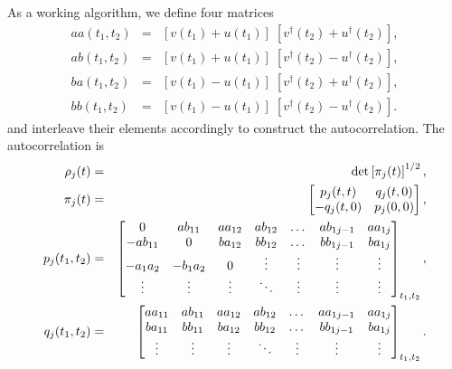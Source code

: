 \documentclass[a4paper,10pt]{article}
\begin{document}
As a working algorithm, we define four matrices
\begin{eqnarray}
  a a  (t_1,t_2) & = & \left[v(t_1)+u(t_1)\right]\;\left[v^\dagger(t_2)+u^\dagger(t_2)\right] ,\nonumber \\
  a b  (t_1,t_2) & = & \left[v(t_1)+u(t_1)\right]\;\left[v^\dagger(t_2)-u^\dagger(t_2)\right] ,\nonumber \\
  b a  (t_1,t_2) & = & \left[v(t_1)-u(t_1)\right]\;\left[v^\dagger(t_2)+u^\dagger(t_2)\right] ,\nonumber \\
  b b  (t_1,t_2) & = & \left[v(t_1)-u(t_1)\right]\;\left[v^\dagger(t_2)-u^\dagger(t_2)\right] .
\end{eqnarray}
and interleave their elements accordingly to construct the autocorrelation. The autocorrelation is
\begin{eqnarray}
\label{eq:aotocorr:formula}
\rho_j(t) &=& {\rm det}\left[\pi_j(t)\right]^{1/2},\nonumber \\
\pi_j(t)  &=& \begin{bmatrix}
            p_j(t,t) & q_j(t,0) \\
            -q_j(t,0) & p_j(0,0)
           \end{bmatrix}, \nonumber \\
p_j(t_1,t_2)  &=& \begin{bmatrix}
                  0 & ab_{11} & aa_{12} & ab_{12} & \dots &  ab_{1 j-1} & aa_{1j}\\
                   - a b_{11}  &        0              &  ba_{12} &  bb_{12}  & \dots &  bb_{1 j-1} &  ba_{1j} \\ 
                    - a_1 a_2   &  - b_1 a_2   & 0 & \vdots & \vdots & \vdots & \vdots \\
                    \vdots                    &   \vdots                    & \vdots    & \ddots &\vdots & \vdots & \vdots
                 \end{bmatrix}_{t_1,t_2} ,\nonumber \\
q_j(t_1,t_2)  &=& \begin{bmatrix}
                    aa_{11} &  ab_{11} &  aa_{12} &  ab_{12} & \dots &  aa_{1 j-1} &  aa_{1j} \\
                    ba_{11} &  bb_{11} &  ba_{12} &  bb_{12} & \dots &  bb_{1j-1} &  ba_{1j}\\
                    \vdots                    &   \vdots                    & \vdots    & \ddots &\vdots & \vdots & \vdots
                  \end{bmatrix}_{t_1,t_2}.
\end{eqnarray}
\end{document}
